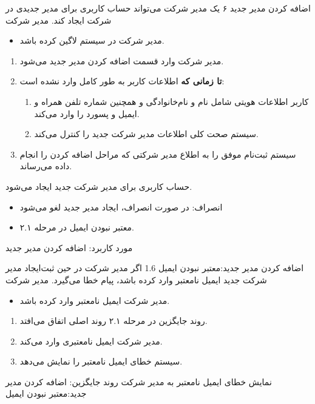 {
\usecase
{اضافه کردن مدیر جدید}
{۶}
{یک مدیر شرکت می‌تواند حساب کاربری برای مدیر جدیدی در شرکت ایجاد کند.}
{مدیر شرکت}
{}
{
	\begin{itemize}
		\item
		مدیر شرکت در سیستم لاگین کرده باشد.
		
	\end{itemize}
}
{
\begin{enumerate}
	\item 
	مدیر شرکت وارد قسمت اضافه کردن مدیر جدید می‌شود.
	
\item
\textbf{تا زمانی که} اطلاعات کاربر به طور کامل وارد نشده است:

\begin{enumerate}[label=\theenumi.\arabic*.]
	\item
	کاربر اطلاعات هویتی شامل نام و نام‌خانوادگی و همچنین شماره تلفن همراه و ایمیل و پسورد را وارد می‌کند.

	
	\item 
	سیستم صحت کلی اطلاعات مدیر شرکت جدید را کنترل می‌کند.
\end{enumerate}

	\item 
سیستم ثبت‌نام موفق را به اطلاع مدیر شرکتی که مراحل اضافه کردن را انجام داده می‌رساند.

\end{enumerate}
}
{
حساب کاربری برای مدیر شرکت جدید ایجاد می‌شود.
}
{\begin{itemize}
		\vspace*{-0.6cm}
		\item انصراف: در صورت انصراف، ایجاد مدیر جدید لغو می‌شود
		\item معتبر نبودن ایمیل در مرحله ۲.۱.
		
		
\end{itemize}}
{مورد کاربرد: اضافه کردن مدیر جدید}



\alternativeflow
{
	اضافه کردن مدیر جدید:معتبر نبودن ایمیل
}
{1.6}
{
	اگر مدیر شرکت در حین ثبت‌ایجاد مدیر شرکت جدید ایمیل نامعتبر وارد کرده باشد، پیام خطا می‌گیرد.
}
{
	مدیر شرکت
}
{}
{
	\begin{itemize}
		
		\item
		مدیر شرکت ایمیل نامعتبر وارد کرده باشد.
	\end{itemize}
}
{
	\vspace*{-0.6cm}
	\begin{enumerate}
		\item 
		روند جایگزین در مرحله ۲.۱ روند اصلی اتفاق می‌افتد.
		\item
		مدیر شرکت ایمیل نامعتبری وارد می‌کند.
		\item 
		سیستم خطای ایمیل نامعتبر را نمایش می‌دهد.
	\end{enumerate}
}
{
	نمایش خطای ایمیل نامعتبر به مدیر شرکت
}
{
	روند جایگزین: 	اضافه کردن مدیر جدید:معتبر نبودن ایمیل
}
}


